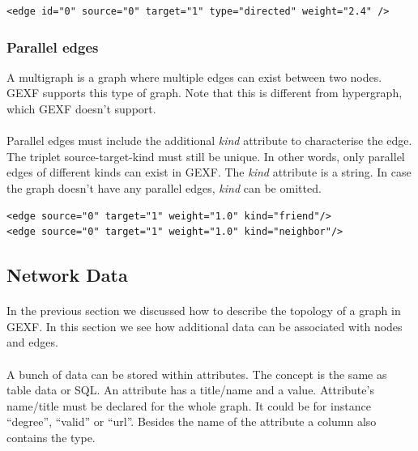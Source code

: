 \documentclass[a4paper,10pt]{article}
\begin{document}
\lstset{ style=gexf }
\begin{lstlisting}[caption={A more complete edge},label=aMoreEdge]
<edge id="0" source="0" target="1" type="directed" weight="2.4" />
\end{lstlisting}

\subsubsection{Parallel edges}

A multigraph is a graph where multiple edges can exist between two nodes.
GEXF supports this type of graph.
Note that this is different from hypergraph, which GEXF doesn't support.

\paragraph{}
Parallel edges must include the additional \textit{kind} attribute to characterise the edge. The triplet source-target-kind must still be unique. In other words, only parallel edges of different kinds can exist in GEXF. The \textit{kind} attribute is a string. In case the graph doesn't have any parallel edges, \textit{kind} can be omitted.

\lstset{ style=gexf }
\begin{lstlisting}[caption={Parallel edges},label=paralelEdge]
<edge source="0" target="1" weight="1.0" kind="friend"/>
<edge source="0" target="1" weight="1.0" kind="neighbor"/>
\end{lstlisting}

\subsection{Network Data} \label{networkdata}

\paragraph{}
In the previous section we discussed how to describe the topology of a graph in GEXF. In this section we see how additional data can be associated with nodes and edges.

\paragraph{}
A bunch of data can be stored within attributes. The concept is the same as table data or SQL. An attribute has a title/name and a value. Attribute’s name/title must be declared for the whole graph. It could be for instance “degree”, “valid” or “url”. Besides the name of the attribute a column also contains the type.
\end{document}
